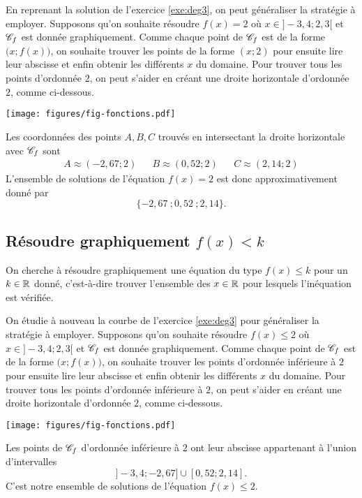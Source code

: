 En reprenant la solution de l'exercice \ref{exe:deg3}, on peut généraliser la stratégie à employer.
Supposons qu'on souhaite résoudre $f(x) = 2$ où $x\in]{-}3,4 ; 2,3[$ et $\mathcal{C}_f$ est donnée graphiquement.
Comme chaque point de $\mathcal{C}_f$ est de la forme $\bigl(x; f(x)\bigr)$, on souhaite trouver les points de la forme $(x;2)$ pour ensuite lire leur abscisse et enfin obtenir les différents $x$ du domaine.
Pour trouver tous les points d'ordonnée $2$, on peut s'aider en créant une droite horizontale d'ordonnée $2$, comme ci-dessous.
	\begin{center}
	\texttt{[image: figures/fig-fonctions.pdf]}
	\end{center}
Les coordonnées des points $A,B,C$ trouvés en intersectant la droite horizontale avec $\mathcal{C}_f$ sont
	\begin{align*}
		A \approx (-2,67 ; 2) && B \approx (0,52 ; 2) && C \approx (2,14 ; 2)
	\end{align*}
L'ensemble de solutions de l'équation $f(x)=2$ est donc approximativement donné par 
	\[ \{ -2,67 \ ; 0,52 \ ; 2,14 \}. \]



\subsection*{Résoudre graphiquement $f(x) < k$}


On cherche à résoudre graphiquement une équation du type $f(x)\leq k$ pour un $k\in\mathbb{R}$ donné, c'est-à-dire trouver l'ensemble des $x\in\mathbb{R}$ pour lesquels l'inéquation est vérifiée.

On étudie à nouveau la courbe de l'exercice \ref{exe:deg3} pour généraliser la stratégie à employer.
Supposons qu'on souhaite résoudre $f(x) \leq 2$ où $x\in]{-}3,4 ; 2,3[$ et $\mathcal{C}_f$ est donnée graphiquement.
Comme chaque point de $\mathcal{C}_f$ est de la forme $\bigl(x; f(x)\bigr)$, on souhaite trouver les points d'ordonnée inférieure à $2$ pour ensuite lire leur abscisse et enfin obtenir les différents $x$ du domaine.
Pour trouver tous les points d'ordonnée inférieure à $2$, on peut s'aider en créant une droite horizontale d'ordonnée $2$, comme ci-dessous.
	\begin{center}
	 \texttt{[image: figures/fig-fonctions.pdf]}
	\end{center}
Les points de $\mathcal{C}_f$ d'ordonnée inférieure à $2$ ont leur abscisse appartenant à l'union d'intervalles
	\[ ] {-}3,4 ; -2,67 ] \cup [0,52 ; 2,14]. \]
C'est notre ensemble de solutions de l'équation $f(x) \leq 2$.

